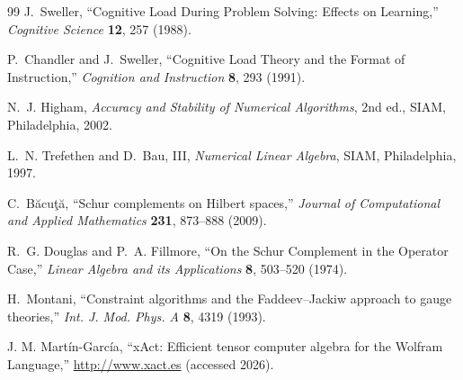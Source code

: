 \documentclass[11pt,a4paper]{article}
\begin{document}
\begin{thebibliography}{99}
	J.~Sweller, ``Cognitive Load During Problem Solving: Effects on Learning,'' \textit{Cognitive Science} \textbf{12}, 257 (1988).
	
	P.~Chandler and J.~Sweller, ``Cognitive Load Theory and the Format of Instruction,'' \textit{Cognition and Instruction} \textbf{8}, 293 (1991).
	
	N.~J. Higham, \textit{Accuracy and Stability of Numerical Algorithms}, 2nd ed., SIAM, Philadelphia, 2002.
	
	L.~N. Trefethen and D.~Bau, III, \textit{Numerical Linear Algebra}, SIAM, Philadelphia, 1997.
	
	C.~B\u{a}cu\c{t}\u{a}, ``Schur complements on Hilbert spaces,'' \textit{Journal of Computational and Applied Mathematics} \textbf{231}, 873--888 (2009).
	
	R.~G. Douglas and P.~A. Fillmore, ``On the Schur Complement in the Operator Case,'' \textit{Linear Algebra and its Applications} \textbf{8}, 503--520 (1974).
	
	H.~Montani, ``Constraint algorithms and the Faddeev--Jackiw approach to gauge theories,'' \textit{Int. J. Mod. Phys. A} \textbf{8}, 4319 (1993).
	
	J. M. Martín-García, ``xAct: Efficient tensor computer algebra for the Wolfram Language,'' \url{http://www.xact.es} (accessed 2026).
\end{thebibliography}
\end{document}
